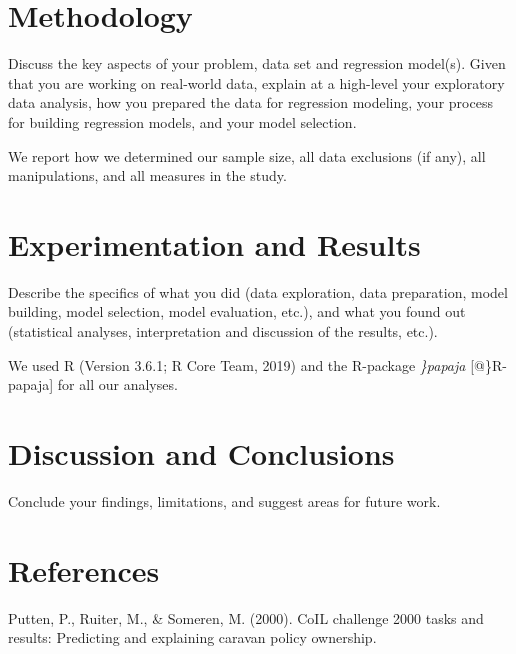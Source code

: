 \documentclass[man]{apa6}
\begin{document}
\hypertarget{methodology}{%
\section{Methodology}\label{methodology}}

Discuss the key aspects of your problem, data set and regression model(s). Given that you are working on real-world data, explain at a high-level your exploratory data analysis, how you prepared the data for regression modeling, your process for building regression models, and your model selection.

We report how we determined our sample size, all data exclusions (if any), all manipulations, and all measures in the study.

\hypertarget{experimentation-and-results}{%
\section{Experimentation and Results}\label{experimentation-and-results}}

Describe the specifics of what you did (data exploration, data preparation, model building, model selection, model evaluation, etc.), and what you found out (statistical analyses, interpretation and discussion of the results, etc.).

We used R (Version 3.6.1; R Core Team, 2019) and the R-package \emph{\}papaja} {[}@\}R-papaja{]} for all our analyses.

\hypertarget{discussion-and-conclusions}{%
\section{Discussion and Conclusions}\label{discussion-and-conclusions}}

Conclude your findings, limitations, and suggest areas for future work.

\newpage

\hypertarget{references}{%
\section{References}\label{references}}

\begingroup
\setlength{\parindent}{-0.5in}
\setlength{\leftskip}{0.5in}

\hypertarget{refs}{}
\leavevmode\hypertarget{ref-Putten-2000}{}%
Putten, P., Ruiter, M., \& Someren, M. (2000). CoIL challenge 2000 tasks and results: Predicting and explaining caravan policy ownership.
\end{document}
